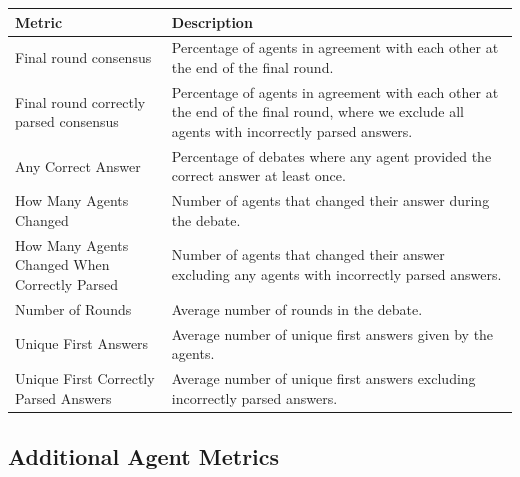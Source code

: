 \begin{tabularx}{\textwidth}{lX} 
    \hline
    \textbf{Metric} & \textbf{Description} \\
    \hline
    Final round consensus & Percentage of agents in agreement with each other at the end of the final round. \\
    Final round correctly parsed consensus & Percentage of agents in agreement with each other at the end of the final round, where we exclude all agents with incorrectly parsed answers. \\
    Any Correct Answer & Percentage of debates where any agent provided the correct answer at least once. \\
    How Many Agents Changed & Number of agents that changed their answer during the debate. \\
    How Many Agents Changed When Correctly Parsed & Number of agents that changed their answer excluding any agents with incorrectly parsed answers. \\
    Number of Rounds & Average number of rounds in the debate. \\
    Unique First Answers & Average number of unique first answers given by the agents. \\
    Unique First Correctly Parsed Answers & Average number of unique first answers excluding incorrectly parsed answers. \\
    \hline
\end{tabularx}

\subsection{Additional Agent Metrics} \label{app:all_agent_metrics}

